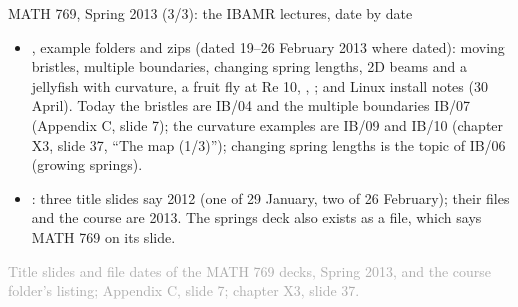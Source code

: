 \documentclass[aspectratio=169,11pt]{beamer}
\newcommand{\sourcecredit}[1]{\vfill\begin{flushright}\tiny\textcolor{DarkGray}{#1}\end{flushright}}
\begin{document}
\begin{frame}{MATH 769, Spring 2013 (3/3): the IBAMR lectures, date by date}
\vspace{2mm}
\scriptsize
\begin{itemize}\setlength{\itemsep}{2pt}
  \item {}, example folders and zips (dated 19--26 February 2013 where dated): moving bristles, multiple boundaries, changing spring lengths, 2D beams and a jellyfish with curvature, a fruit fly at Re 10, , ; and Linux install notes (30 April). Today the bristles are IB/04 and the multiple boundaries IB/07 (Appendix C, slide 7); the curvature examples are IB/09 and IB/10 (chapter X3, slide 37, ``The map (1/3)''); changing spring lengths is the topic of IB/06 (growing springs).
  \item {}: three title slides say 2012 (one of 29 January, two of 26 February); their files and the course are 2013. The springs deck also exists as a  file, which says MATH 769 on its slide.
\end{itemize}
\sourcecredit{Title slides and file dates of the MATH 769 decks, Spring 2013, and the course folder's listing; Appendix C, slide 7; chapter X3, slide 37.}
\end{frame}
\end{document}
